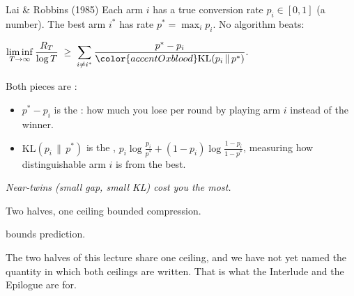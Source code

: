 \begin{frame}{Lai \& Robbins (1985)}
  \footnotesize
  Each arm $i$ has a true conversion rate $p_i \in [0, 1]$ (a number).
  The best arm $i^*$ has rate $p^* = \max_i p_i$.  No algorithm beats:

  \smallskip
  \begin{center}
    $\displaystyle
      \liminf_{T \to \infty}\frac{R_T}{\log T}
      \;\geq\;
      \sum_{i \neq i^*} \frac{p^* - p_i}{{\color{accentOxblood}\mathrm{KL}(p_i \,\|\, p^*)}}.$
  \end{center}

  Both pieces are :
  \begin{itemize}
    \setlength{\itemsep}{0.05em}
    \item $p^* - p_i$ is the : how much you lose per
          round by playing arm $i$ instead of the winner.
    \item $\mathrm{KL}(p_i \,\|\, p^*)$ is the
          ,
          $p_i \log\!\frac{p_i}{p^*}
            + (1 - p_i)\log\!\frac{1 - p_i}{1 - p^*}$,
          measuring how distinguishable arm $i$ is from the best.
  \end{itemize}

  \begin{center}
    \scriptsize\itshape\color{mutedWarmGray}
    Near-twins (small gap, small KL) cost you the most.
  \end{center}
\end{frame}

\begin{frame}{Two halves, one ceiling}
   bounded compression.

  \medskip

   bounds prediction.

  \medskip

  The two halves of this lecture share one ceiling, and we
  have not yet named the quantity in which both ceilings are written.
  That is what the Interlude and the Epilogue are for.
\end{frame}
